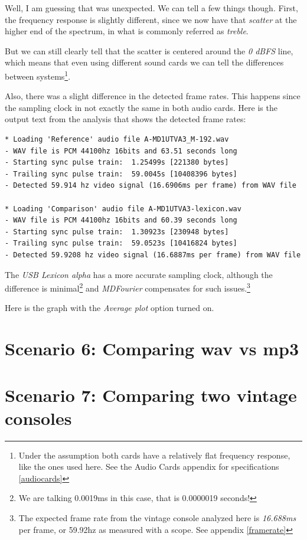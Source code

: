 \documentclass[10pt,a4paper]{report}
\begin{document}
Well, I am guessing that was unexpected. We can tell a few things though. First, the frequency response is slightly different, since we now have that \textit{scatter} at the higher end of the spectrum, in what is commonly referred as \textit{treble}.

But we can still clearly tell that the scatter is centered around the \textit{0 dBFS} line, which means that even using different sound cards we can tell the differences between systems\footnote{Under the assumption both cards have a relatively flat frequency response, like the ones used here. See the Audio Cards appendix for specifications \ref{audiocards}}. 

Also, there was a slight difference in the detected frame rates. This happens since the sampling clock in not exactly the same in both audio cards. Here is the output text from the analysis that shows the detected frame rates:

\begin{verbatim}
* Loading 'Reference' audio file A-MD1UTVA3_M-192.wav
- WAV file is PCM 44100hz 16bits and 63.51 seconds long
- Starting sync pulse train:  1.25499s [221380 bytes]
- Trailing sync pulse train:  59.0045s [10408396 bytes]
- Detected 59.914 hz video signal (16.6906ms per frame) from WAV file

* Loading 'Comparison' audio file A-MD1UTVA3-lexicon.wav
- WAV file is PCM 44100hz 16bits and 60.39 seconds long
- Starting sync pulse train:  1.30923s [230948 bytes]
- Trailing sync pulse train:  59.0523s [10416824 bytes]
- Detected 59.9208 hz video signal (16.6887ms per frame) from WAV file
\end{verbatim}

The \textit{USB Lexicon alpha} has a more accurate sampling clock, although the difference is minimal\footnote{We are talking 0.0019ms in this case, that is 0.0000019 seconds!} and \textit{MDFourier} compensates for such issues.\footnote{The expected frame rate from the vintage console analyzed here is \textit{16.688ms} per frame, or 59.92hz as measured with a scope. See appendix \ref{framerate}}

Here is the graph with the \textit{Average plot} option turned on.

\section{Scenario 6: Comparing wav vs mp3}
\label{mp3}

\section{Scenario 7: Comparing two vintage consoles}
\end{document}
